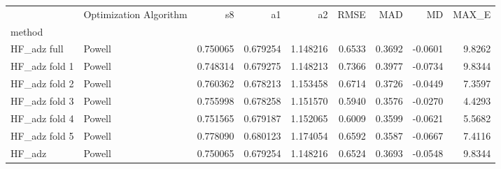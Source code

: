 \begin{tabular}{llrrrrrrr}
 & Optimization Algorithm & s8 & a1 & a2 & RMSE & MAD & MD & MAX_E \\
method &  &  &  &  &  &  &  &  \\
HF_adz full & Powell & 0.750065 & 0.679254 & 1.148216 & 0.6533 & 0.3692 & -0.0601 & 9.8262 \\
HF_adz fold 1 & Powell & 0.748314 & 0.679275 & 1.148213 & 0.7366 & 0.3977 & -0.0734 & 9.8344 \\
HF_adz fold 2 & Powell & 0.760362 & 0.678213 & 1.153458 & 0.6714 & 0.3726 & -0.0449 & 7.3597 \\
HF_adz fold 3 & Powell & 0.755998 & 0.678258 & 1.151570 & 0.5940 & 0.3576 & -0.0270 & 4.4293 \\
HF_adz fold 4 & Powell & 0.751565 & 0.679187 & 1.152065 & 0.6009 & 0.3599 & -0.0621 & 5.5682 \\
HF_adz fold 5 & Powell & 0.778090 & 0.680123 & 1.174054 & 0.6592 & 0.3587 & -0.0667 & 7.4116 \\
HF_adz & Powell & 0.750065 & 0.679254 & 1.148216 & 0.6524 & 0.3693 & -0.0548 & 9.8344 \\
\end{tabular}
